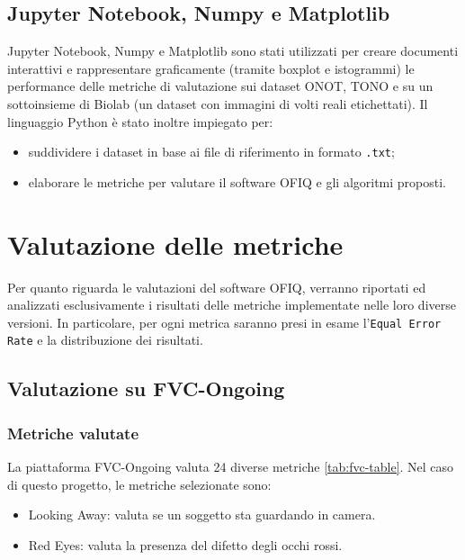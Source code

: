 \documentclass[12pt,a4paper,openright,twoside]{book}
\begin{document}
\section{Jupyter Notebook, Numpy e Matplotlib}
Jupyter Notebook, Numpy e Matplotlib sono stati utilizzati per creare documenti interattivi e rappresentare graficamente (tramite boxplot e istogrammi) le performance delle metriche di valutazione sui dataset ONOT, TONO e su un sottoinsieme di Biolab (un dataset con immagini di volti reali etichettati).
Il linguaggio Python è stato inoltre impiegato per:
\begin{itemize}
    \item suddividere i dataset in base ai file di riferimento in formato \texttt{.txt};
    \item elaborare le metriche per valutare il software OFIQ e gli algoritmi proposti.
\end{itemize}

\chapter{Valutazione delle metriche}
Per quanto riguarda le valutazioni del software OFIQ, verranno riportati ed analizzati esclusivamente i risultati delle metriche implementate nelle loro diverse versioni. 
In particolare, per ogni metrica saranno presi in esame l'\texttt{Equal Error Rate} e la distribuzione dei risultati.

\section{Valutazione su FVC-Ongoing}

\subsection{Metriche valutate}
La piattaforma FVC-Ongoing valuta 24 diverse metriche \cref{tab:fvc-table}.
Nel caso di questo progetto, le metriche selezionate sono:
\begin{itemize}
    \item Looking Away: valuta se un soggetto sta guardando in camera.
    \item Red Eyes: valuta la presenza del difetto degli occhi rossi.
\end{itemize}
\end{document}

